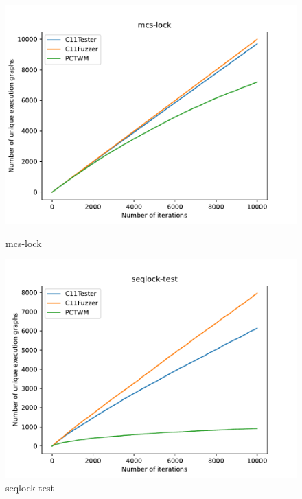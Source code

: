 \begin{figure}[H]
    \begin{minipage}{0.45\textwidth}
		\centering
		\includegraphics[width=\textwidth]{figure/pctwm/mcs-lock.pdf}
		\caption{mcs-lock}
		\label{pctwm-mcs-lock}
	\end{minipage}
	\hfill
	\begin{minipage}{0.45\textwidth}
		\centering
		\includegraphics[width=\textwidth]{figure/pctwm/seqlock-test.pdf}
		\caption{seqlock-test}
		\label{pctwm-seqlock-test}
	\end{minipage}
	\vspace{0.5cm}


\end{figure}
